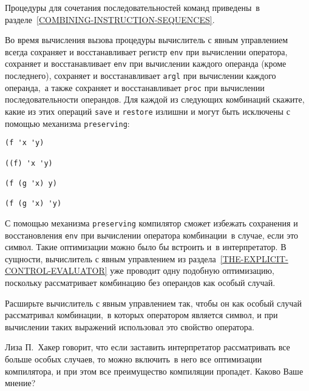 Процедуры для сочетания последовательностей команд
приведены~в 
разделе~\ref{COMBINING-INSTRUCTION-SEQUENCES}.
\begin{exercise}{5.31}%
\label{EX5.31}%
Во время вычисления вызова процедуры вычислитель с явным
управлением всегда сохраняет и восстанавливает регистр
{\tt env} при вычислении оператора, сохраняет и восстанавливает
{\tt env} при вычислении каждого операнда (кроме последнего),
сохраняет и восстанавливает {\tt argl} при вычислении каждого
операнда,~а также сохраняет и восстанавливает {\tt proc} при
вычислении последовательности операндов.  Для каждой из следующих
комбинаций скажите, какие из этих операций {\tt save} и
{\tt restore} излишни и могут быть исключены с помощью
механизма {\tt preserving}:

\begin{Verbatim}[fontsize=\small]
(f 'x 'y)

((f) 'x 'y)

(f (g 'x) y)

(f (g 'x) 'y)
\end{Verbatim}
\end{exercise}
\begin{exercise}{5.32}%
\label{EX5.32}%
С помощью механизма {\tt preserving} компилятор
сможет избежать сохранения и восстановления {\tt env} при
вычислении оператора комбинации~в случае, если это символ.  Такие
оптимизации можно было бы встроить и~в интерпретатор.  В сущности,
вычислитель с явным управлением из 
раздела~\ref{THE-EXPLICIT-CONTROL-EVALUATOR} уже проводит одну
подобную оптимизацию, поскольку рассматривает комбинацию без операндов
как особый случай.

\begin{plainenum}


\item
Расширьте вычислитель с явным управлением так,
чтобы он как особый случай рассматривал комбинации,~в которых
оператором является символ, и при вычислении таких выражений
использовал это свойство оператора.

\item
Лиза П.~Хакер говорит, что если заставить
интерпретатор рассматривать все больше особых случаев, то можно
включить~в него все оптимизации компилятора, и при этом все
преимущество компиляции пропадет.  Каково Ваше мнение?
\end{plainenum}
\end{exercise}

